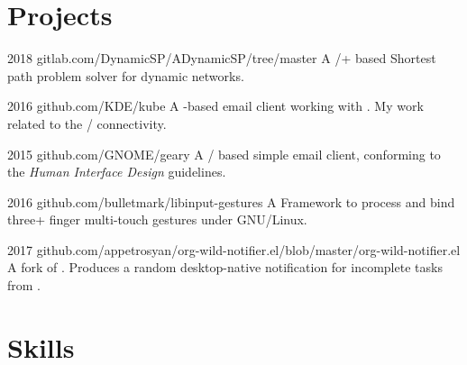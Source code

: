 \documentclass{CurriculumVitae}[10pt, draft]
\begin{document}
\section*{Projects}

 {2018}
{gitlab.com/DynamicSP/ADynamicSP/tree/master} {A
  /+ based Shortest path problem solver
  for dynamic networks. }

 {2016} {github.com/KDE/kube} {A -based
  email client working with . My work related to
  the / connectivity. }

 {2015} {github.com/GNOME/geary} {A
  / based simple email client, conforming to
  the  \emph{Human Interface Design} guidelines.}

 {2016}
{github.com/bulletmark/libinput-gestures} {A Framework to process and
  bind three+ finger multi-touch gestures under GNU/Linux. }

 {2017}
{github.com/appetrosyan/org-wild-notifier.el/blob/master/org-wild-notifier.el}
{A fork of . Produces a random desktop-native
  notification for incomplete tasks from . }



\section*{Skills}
\end{document}
